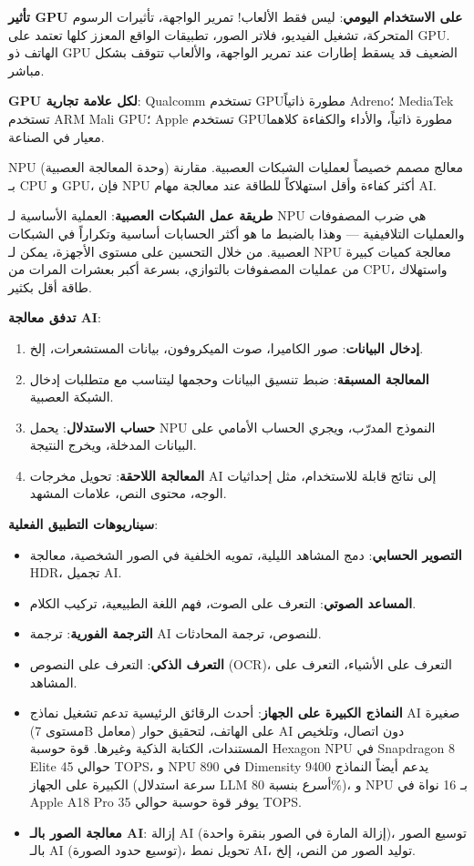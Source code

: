 \textbf{تأثير GPU على الاستخدام اليومي}: ليس فقط الألعاب! تمرير الواجهة، تأثيرات الرسوم المتحركة، تشغيل الفيديو، فلاتر الصور، تطبيقات الواقع المعزز كلها تعتمد على GPU. الهاتف ذو GPU الضعيف قد يسقط إطارات عند تمرير الواجهة، والألعاب تتوقف بشكل مباشر.

\textbf{GPU لكل علامة تجارية}: Qualcomm تستخدم GPUمطورة ذاتياً Adreno؛ MediaTek تستخدم ARM Mali GPU؛ Apple تستخدم GPUمطورة ذاتياً، والأداء والكفاءة كلاهما معيار في الصناعة.


NPU (وحدة المعالجة العصبية) معالج مصمم خصيصاً لعمليات الشبكات العصبية. مقارنة بـ CPU و GPU، فإن NPU أكثر كفاءة وأقل استهلاكاً للطاقة عند معالجة مهام AI.

\textbf{طريقة عمل الشبكات العصبية}: العملية الأساسية لـ NPU هي ضرب المصفوفات والعمليات التلافيفية — وهذا بالضبط ما هو أكثر الحسابات أساسية وتكراراً في الشبكات العصبية. من خلال التحسين على مستوى الأجهزة، يمكن لـ NPU معالجة كميات كبيرة من عمليات المصفوفات بالتوازي، بسرعة أكبر بعشرات المرات من CPU، واستهلاك طاقة أقل بكثير.

\textbf{تدفق معالجة AI}:

\begin{enumerate}
  \item \textbf{إدخال البيانات}: صور الكاميرا، صوت الميكروفون، بيانات المستشعرات، إلخ.
  \item \textbf{المعالجة المسبقة}: ضبط تنسيق البيانات وحجمها ليتناسب مع متطلبات إدخال الشبكة العصبية.
  \item \textbf{حساب الاستدلال}: يحمل NPU النموذج المدرّب، ويجري الحساب الأمامي على البيانات المدخلة، ويخرج النتيجة.
  \item \textbf{المعالجة اللاحقة}: تحويل مخرجات AI إلى نتائج قابلة للاستخدام، مثل إحداثيات الوجه، محتوى النص، علامات المشهد.
\end{enumerate}

\textbf{سيناريوهات التطبيق الفعلية}:

\begin{itemize}
  \item \textbf{التصوير الحسابي}: دمج المشاهد الليلية، تمويه الخلفية في الصور الشخصية، معالجة HDR، تجميل AI.
  \item \textbf{المساعد الصوتي}: التعرف على الصوت، فهم اللغة الطبيعية، تركيب الكلام.
  \item \textbf{الترجمة الفورية}: ترجمة AI للنصوص، ترجمة المحادثات.
  \item \textbf{التعرف الذكي}: التعرف على النصوص (OCR)، التعرف على الأشياء، التعرف على المشاهد.
  \item \textbf{النماذج الكبيرة على الجهاز}: أحدث الرقائق الرئيسية تدعم تشغيل نماذج AI صغيرة (مستوى 7B معامل) على الهاتف، لتحقيق حوار AI دون اتصال، وتلخيص المستندات، الكتابة الذكية وغيرها. قوة حوسبة Hexagon NPU في Snapdragon 8 Elite حوالي 45 TOPS، و NPU 890 في Dimensity 9400 يدعم أيضاً النماذج الكبيرة على الجهاز (سرعة استدلال LLM أسرع بنسبة 80\%)، و NPU بـ 16 نواة في Apple A18 Pro يوفر قوة حوسبة حوالي 35 TOPS.
  \item \textbf{معالجة الصور بالـ AI}: إزالة AI (إزالة المارة في الصور بنقرة واحدة)، توسيع الصور بالـ AI (توسيع حدود الصورة)، تحويل نمط AI، توليد الصور من النص، إلخ.
\end{itemize}

